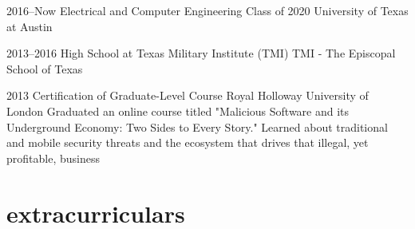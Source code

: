 \documentclass[]{friggeri-cv} %
\begin{document}
\begin{entrylist}

	\vspace{-10pt}
	\entry
	{2016--Now}
	{Electrical and Computer Engineering Class of 2020}
	{University of Texas at Austin}


	\vspace{-10pt}
	\entry
	{2013--2016}
	{High School at Texas Military Institute (TMI)}
	{TMI - The Episcopal School of Texas}


	\entry
	{2013}
	{Certification of Graduate-Level Course}
	{Royal Holloway University of London}
	{Graduated an online course titled "Malicious Software and its Underground Economy: Two Sides to Every Story." Learned about traditional and mobile security threats and the ecosystem that drives that illegal, yet profitable, business}

\end{entrylist}

\vspace{-.5pt}

\section{extracurriculars}
\end{document}
